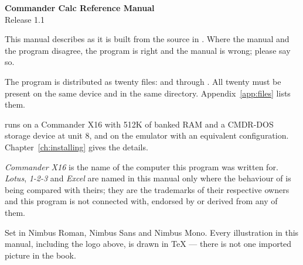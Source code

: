 \thispagestyle{empty}
\ccthumbfalse

\vspace*{\fill}

{\fontsize{9}{12.5}\selectfont

\textbf{Commander Calc Reference Manual}\\
Release 1.1

\vspace{10pt}

This manual describes \ccprod{} as it is built from the source in
. Where the manual and the program disagree, the program is
right and the manual is wrong; please say so.

\vspace{10pt}

The program is distributed as twenty files:  and
 through . All twenty must be present on the
same device and in the same directory. Appendix~\ref{app:files} lists them.

\vspace{10pt}

\ccprod{} runs on a Commander X16 with 512K of banked RAM and a CMDR-DOS
storage device at unit 8, and on the  emulator with an equivalent
configuration. Chapter~\ref{ch:installing} gives the details.

\vspace{16pt}

\textit{Commander X16} is the name of the computer this program was written
for. \textit{Lotus}, \textit{1-2-3} and \textit{Excel} are named in this manual
only where the behaviour of \ccprod{} is being compared with theirs; they are
the trademarks of their respective owners and this program is not connected
with, endorsed by or derived from any of them.

\vspace{16pt}

Set in Nimbus Roman, Nimbus Sans and Nimbus Mono. Every illustration in this
manual, including the logo above, is drawn in \TeX{} --- there is not one
imported picture in the book.

}

\vspace{22pt}

{\ccmark[0.42in]}

\vspace{0.35in}

\clearpage
